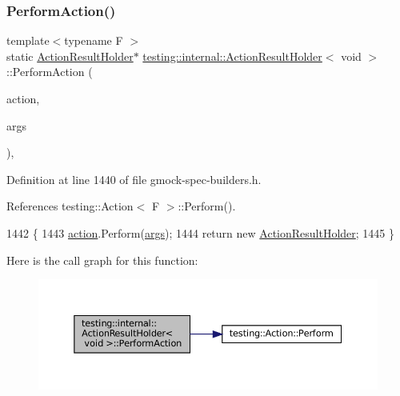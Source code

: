 \subsubsection{\texorpdfstring{Perform\+Action()}{PerformAction()}}
{\footnotesize\ttfamily template$<$typename F $>$ \\
static \hyperlink{classtesting_1_1internal_1_1ActionResultHolder}{Action\+Result\+Holder}$\ast$ \hyperlink{classtesting_1_1internal_1_1ActionResultHolder}{testing\+::internal\+::\+Action\+Result\+Holder}$<$ void $>$\+::Perform\+Action (\begin{DoxyParamCaption}\item[{const \hyperlink{classtesting_1_1Action}{Action}$<$ F $>$ \&}]{action,  }\item[{const typename \hyperlink{structtesting_1_1internal_1_1Function}{Function}$<$ F $>$\+::Argument\+Tuple \&}]{args }\end{DoxyParamCaption})\hspace{0.3cm}{\ttfamily [inline]}, {\ttfamily [static]}}



Definition at line 1440 of file gmock-\/spec-\/builders.\+h.



References testing\+::\+Action$<$ F $>$\+::\+Perform().


\begin{DoxyCode}
1442                                                      \{
1443     \hyperlink{namespaceupload_a675d13c979f1c720866d22ed1736f580}{action}.Perform(\hyperlink{namespacegenerate__debs_a75f9143e38df82d83b2e8a6f99cae02c}{args});
1444     \textcolor{keywordflow}{return} \textcolor{keyword}{new} \hyperlink{classtesting_1_1internal_1_1ActionResultHolder_3_01void_01_4_a4f721cbdde35fde62920fd2495dc55d3}{ActionResultHolder};
1445   \}
\end{DoxyCode}
Here is the call graph for this function\+:
\nopagebreak
\begin{figure}[H]
\begin{center}
\leavevmode
\includegraphics[width=350pt]{classtesting_1_1internal_1_1ActionResultHolder_3_01void_01_4_abb1d387e21341393e0c237ae7b02ee68_cgraph}
\end{center}
\end{figure}
\mbox{\label{classtesting_1_1internal_1_1ActionResultHolder_3_01void_01_4_a140b6ab6a756e60db62e76b01b09a26f}} 
